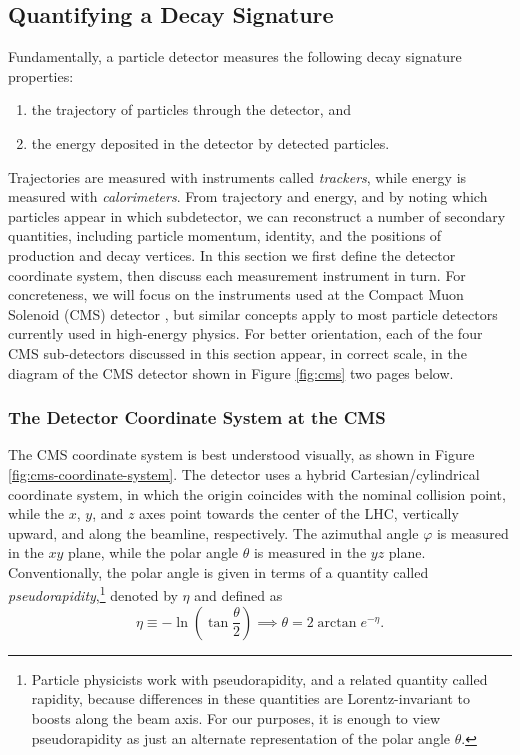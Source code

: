\documentclass[11pt, a4paper]{article}
\begin{document}
\subsection{Quantifying a Decay Signature} \label{ss:quantify-decay}
Fundamentally, a particle detector measures the following decay signature properties:
\begin{enumerate}

    \item the trajectory of particles through the detector, and

    \item the energy deposited in the detector by detected particles.

\end{enumerate}
Trajectories are measured with instruments called \textit{trackers}, while energy is measured with \textit{calorimeters}. From trajectory and energy, and by noting which particles appear in which subdetector, we can reconstruct a number of secondary quantities, including particle momentum, identity, and the positions of production and decay vertices. In this section we first define the detector coordinate system, then discuss each measurement instrument in turn. For concreteness, we will focus on the instruments used at the Compact Muon Solenoid (CMS) detector \cite{cms}, but similar concepts apply to most particle detectors currently used in high-energy physics. For better orientation, each of the four CMS sub-detectors discussed in this section appear, in correct scale, in the diagram of the CMS detector shown in Figure \ref{fig:cms} two pages below.

\subsubsection{The Detector Coordinate System at the CMS}
The CMS coordinate system is best understood visually, as shown in Figure \ref{fig:cms-coordinate-system}. The detector uses a hybrid Cartesian/cylindrical coordinate system, in which the origin coincides with the nominal collision point, while the $ x $, $ y $, and $ z $ axes point towards the center of the LHC, vertically upward, and along the beamline, respectively. The azimuthal angle $ \varphi $ is measured in the $ xy $ plane, while the polar angle $ \theta $ is measured in the $ yz $ plane. Conventionally, the polar angle is given in terms of a quantity called \textit{pseudorapidity},\footnote{Particle physicists work with pseudorapidity, and a related quantity called rapidity, because differences in these quantities are Lorentz-invariant to boosts along the beam axis. For our purposes, it is enough to view pseudorapidity as just an alternate representation of the polar angle $ \theta $.} denoted by $ \eta $ and defined as
\begin{equation}
    \eta \equiv - \ln \left( \tan \frac{\theta}{2} \right) \implies \theta = 2 \arctan e^{- \eta}. \label{eq:pseudorapidity}
\end{equation}
\end{document}
